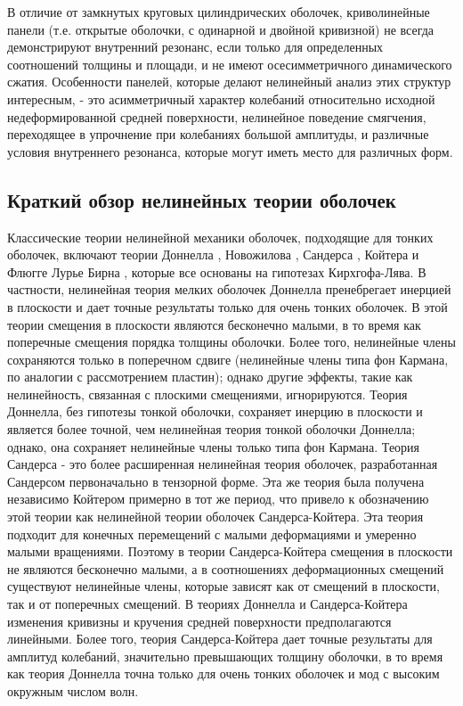 В отличие от замкнутых круговых цилиндрических оболочек, криволинейные панели (т.е. открытые оболочки, с одинарной и двойной кривизной) не всегда демонстрируют внутренний резонанс, если только для определенных соотношений толщины и площади, и не имеют осесимметричного динамического сжатия.  Особенности панелей, которые делают нелинейный анализ этих структур интересным, - это асимметричный характер колебаний относительно исходной недеформированной средней поверхности, нелинейное поведение смягчения, переходящее в упрочнение при колебаниях большой амплитуды, и различные условия внутреннего резонанса, которые могут иметь место для различных форм.


\subsection{Краткий обзор нелинейных теории оболочек} \label{ch:ch3/sec1/sub1}

Классические теории нелинейной механики оболочек, подходящие для тонких оболочек, включают теории Доннелла \cite{donnel1934}, Новожилова \cite{novozhilov1953}, Сандерса \cite{sanders1963}, Койтера \cite{koiter1966} и Флюгге Лурье Бирна \cite{ginsberg1973}, которые все основаны на гипотезах Кирхгофа-Лява. В частности, нелинейная теория мелких оболочек Доннелла пренебрегает инерцией в плоскости и дает точные результаты только для очень тонких оболочек. В этой теории смещения в плоскости являются бесконечно малыми, в то время как поперечные смещения порядка толщины оболочки. Более того, нелинейные члены сохраняются только в поперечном сдвиге (нелинейные члены типа фон Кармана, по аналогии с рассмотрением пластин); однако другие эффекты, такие как нелинейность, связанная с плоскими смещениями, игнорируются. Теория Доннелла, без гипотезы тонкой оболочки, сохраняет инерцию в плоскости и является более точной, чем нелинейная теория тонкой оболочки Доннелла; однако, она сохраняет нелинейные члены только типа фон Кармана. Теория Сандерса - это более расширенная нелинейная теория оболочек, разработанная Сандерсом \cite{sanders1963} первоначально в тензорной форме. Эта же теория была получена независимо Койтером \cite{koiter1966} примерно в тот же период, что привело к обозначению этой теории как нелинейной теории оболочек Сандерса-Койтера. Эта теория подходит для конечных перемещений с малыми деформациями и умеренно малыми вращениями. Поэтому в теории Сандерса-Койтера смещения в плоскости не являются бесконечно малыми, а в соотношениях деформационных смещений существуют нелинейные члены, которые зависят как от смещений в плоскости, так и от поперечных смещений. В теориях Доннелла и Сандерса-Койтера изменения кривизны и кручения средней поверхности предполагаются линейными. Более того, теория Сандерса-Койтера дает точные результаты для амплитуд колебаний, значительно превышающих толщину оболочки, в то время как теория Доннелла точна только для очень тонких оболочек и мод с высоким окружным числом волн.


